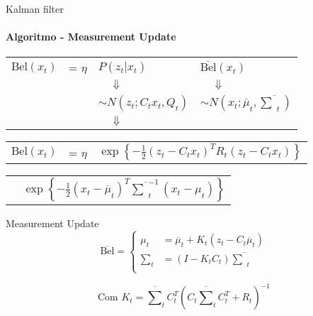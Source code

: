 \documentclass{beamer}
\begin{document}
\begin{frame}[c]{Kalman filter}
    \framesubtitle{Algoritmo -  Measurement Update}
    \begin{tabular}{p{1.5cm} l l l}
        $\text{Bel}(x_t)$  & = $\eta$ & $P(z_t| x_t)$ & $\overline{\text{Bel}}(x_t)$ \\
        & & $\quad \Downarrow$ & $\quad\Downarrow$ \\
        & & $\sim N\left(z_t; C_t x_t, Q_t\right)$ & $\sim N\left(x_t; \overline{\mu}_t, \overline{\textstyle\sum}_t\right)$ \\
        & & $\quad \Downarrow$ &  \\
    \end{tabular}

   \begin{tabular}{p{1.5cm} l l}
        $\text{Bel}(x_t)$  & = $\eta$ & $\exp\left\{  -\displaystyle\frac{1}{2} \left(z_t - C_t x_t\right)^T R_t \left(z_t - C_t x_t\right)  \right\}$ \\
    \end{tabular}
    
    \begin{tabular}{p{2.5cm} l}
        & $\exp\left\{ -\displaystyle\frac{1}{2} \left(x_t - \overline{\mu}_t\right)^T \overline{\textstyle\sum}_t^{-1} \left(x_t - \mu_t\right) \right\}$
    \end{tabular}  

    \begin{block}{Measurement Update}
        \begin{equation}
            \overline{\text{Bel}} = 
            \left\{
            \begin{aligned}
                    \mu_t & = \overline{\mu}_t + K_t(z_t -C_t \overline{\mu}_t)\\
                    \textstyle\sum_t & = (I-K_tC_t)\overline{\textstyle\sum}_t \\
            \end{aligned} \right.
        \end{equation}

        \begin{equation}
            \text{Com }
            K_t = \overline{\textstyle\sum}_tC_t^T(C_t\overline{\textstyle\sum}_tC_t^T+R_t)^{-1}
        \end{equation}
    \end{block} 
\end{frame}
\end{document}
